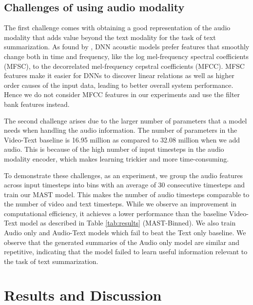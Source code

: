 \documentclass[11pt,a4paper]{article}
\begin{document}
\subsection{Challenges of using audio modality}
The first challenge comes with obtaining a good representation of the audio modality that adds value beyond the text modality for the task of text summarization. As found by \citet*{Mohamed2014DeepNN}, DNN acoustic models prefer features that smoothly change both in time and frequency, like the log mel-frequency spectral coefficients (MFSC), to the decorrelated mel-frequency cepstral coefficients (MFCC). MFSC features make it easier for DNNs to discover linear relations as well as higher order causes of the input data, leading to better overall system performance. Hence we do not consider MFCC features in our experiments and use the filter bank features instead.

The second challenge arises due to the larger number of parameters that a model needs when handling the audio information. The number of parameters in the Video-Text baseline is 16.95 million as compared to 32.08 million when we add audio. This is because of the high number of input timesteps in the audio modality encoder, which makes learning trickier and more time-consuming.

To demonstrate these challenges, as an experiment, we group the audio features across input timesteps into bins with an average of 30 consecutive timesteps and train our MAST model. This makes the number of audio timesteps comparable to the number of video and text timesteps. While we observe an improvement in computational efficiency, it achieves a lower performance than the baseline Video-Text model as described in Table \ref{tab:results} (MAST-Binned). We also train Audio only and Audio-Text models which fail to beat the Text only baseline. We observe that the generated summaries of the Audio only model are similar and repetitive, indicating that the model failed to learn useful information relevant to the task of text summarization.

\section{Results and Discussion}
\end{document}
